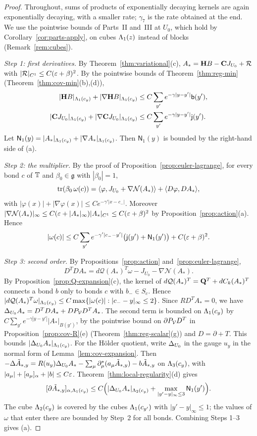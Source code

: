 \begin{proof}
Throughout, sums of products of exponentially decaying kernels are again exponentially decaying, with a smaller rate; $\gamma_7$ is the rate obtained at the end. We use the pointwise bounds of Parts~II and~III at $U_0$, which hold by Corollary~\ref{cor:parts-apply}, on cubes $\Lambda_1(z)$ instead of blocks (Remark~\ref{rem:cubes}).

\emph{Step 1: first derivatives.} By Theorem~\ref{thm:variational}(c), $A_*=\mathbf H B-\mathbf C J_{U_0}+\mathcal R$ with $|\mathcal R|_{C^1}\le C(\varepsilon+\beta)^2$. By the pointwise bounds of Theorem~\ref{thm:reg-min} (Theorem~\ref{thm:cov-min}(b),(d)),
\[
\begin{aligned}
|\mathbf H B|_{\Lambda_1(c_y)}+|\nabla\mathbf H B|_{\Lambda_1(c_y)}&\le C\sum_{y'}e^{-\gamma|y-y'|}\mathsf b(y'),\\
|\mathbf C J_{U_0}|_{\Lambda_1(c_y)}+|\nabla\mathbf C J_{U_0}|_{\Lambda_1(c_y)}&\le C\sum_{y'}e^{-\gamma|y-y'|}\mathsf j(y').
\end{aligned}
\]
Let $\mathsf N_1(y)=|A_*|_{\Lambda_1(c_y)}+|\nabla A_*|_{\Lambda_1(c_y)}$. Then $\mathsf N_1(y)$ is bounded by the right-hand side of (a).

\emph{Step 2: the multiplier.} By the proof of Proposition~\ref{prop:euler-lagrange}, for every bond $c$ of $\mathbb T$ and $\beta_0\in\mathfrak g$ with $|\beta_0|=1$,
\[
\operatorname{tr}(\beta_0\,\omega(c))=\langle \varphi,J_{U_0}+\nabla\mathcal N(A_*)\rangle+\langle D\varphi,DA_*\rangle,
\]
with $|\varphi(x)|+|\nabla\varphi(x)|\le Ce^{-\gamma'|x-c_-|}$. Moreover $|\nabla\mathcal N(A_*)|_\infty\le C(\varepsilon+|A_*|_\infty)|A_*|_{C^1}\le C(\varepsilon+\beta)^2$ by Proposition~\ref{prop:action}(a). Hence
\[
|\omega(c)|\le C\sum_{y'}e^{-\gamma'|c_--y'|}\big(\mathsf j(y')+\mathsf N_1(y')\big)+C(\varepsilon+\beta)^2 .
\]

\emph{Step 3: second order.} By Propositions~\ref{prop:action} and~\ref{prop:euler-lagrange},
\[
D^TDA_*=d\mathcal Q(A_*)^T\omega-J_{U_0}-\nabla\mathcal N(A_*).
\]
By Proposition~\ref{prop:Q-expansion}(c), the kernel of $d\mathcal Q(A_*)^T=\mathbf Q^T+dC_k(A_*)^T$ connects a bond $b$ only to bonds $c$ with $b_-\in S_c$. Hence $|d\mathcal Q(A_*)^T\omega|_{\Lambda_1(c_y)}\le C\max\{|\omega(c)|:|c_--y|_\infty\le2\}$. Since $RD^TA_*=0$, we have $\Delta_{U_0}A_*=D^TDA_*+DP_\mathcal V D^TA_*$. The second term is bounded on $\Lambda_1(c_y)$ by $C\sum_{y'}e^{-\gamma|y-y'|}|A_*|_{B(y')}$, by the pointwise bound on $\partial P_\mathcal V D^T$ in Proposition~\ref{prop:cov-R}(e) (Theorem~\ref{thm:reg-scalar}(g)) and $D=\partial+T$. This bounds $|\Delta_{U_0}A_*|_{\Lambda_1(c_y)}$. For the H\"older quotient, write $\Delta_{U_0}$ in the gauge $u_y$ in the normal form of Lemma~\ref{lem:cov-expansion}. Then $-\Delta\tilde A_{*,y}=R(u_y)\Delta_{U_0}A_*-\sum_\mu\partial^*_\mu(a_\mu\tilde A_{*,y})-b\tilde A_{*,y}$ on $\Lambda_3(c_y)$, with $|a_\mu|+[a_\mu]_\alpha+|b|\le C\varepsilon$. Theorem~\ref{thm:local-regularity}(d) gives
\[
[\partial\tilde A_{*,y}]_{\alpha,\Lambda_1(c_y)}\le C\Big(|\Delta_{U_0}A_*|_{\Lambda_2(c_y)}+\max_{|y'-y|_\infty\le3}\mathsf N_1(y')\Big).
\]
The cube $\Lambda_2(c_y)$ is covered by the cubes $\Lambda_1(c_{y'})$ with $|y'-y|_\infty\le1$; the values of $\omega$ that enter there are bounded by Step~2 for all bonds. Combining Steps 1--3 gives (a).


\end{proof}
